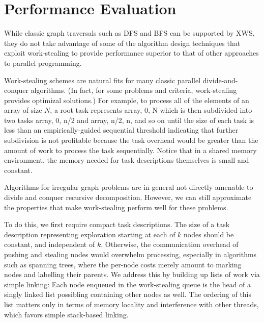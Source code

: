 \section{Performance Evaluation}\label{sec:Performance}

While classic graph traversals such as DFS and BFS can be supported by
XWS, they do not take advantage of some of the algorithm design
techniques that exploit work-stealing to provide performance superior
to that of other approaches to parallel programming.

Work-stealing schemes are natural fits for many classic parallel
divide-and-conquer algorithms. (In fact, for some problems and
criteria, work-stealing provides optimizal solutions.) For example, to
process all of the elements of an array of size $N$, a root task
represents {array, 0, N} which is then subdivided into two tasks
{array, 0, n/2} and {array, n/2, n}, and so on until the size of each
task is less than an empirically-guided sequential threshold
indicating that further subdivision is not profitable because the task
overhead would be greater than the amount of work to process the task
sequentially. Notice that in a shared memory environment, the memory
needed for task descriptions themselves is small and constant.

Algorithms for irregular graph problems are in general not directly
amenable to divide and conquer recursive decomposition. However, we
can still approximate the properties that make work-stealing perform
well for these problems.

To do this, we first require compact task descriptions.  The size of a
task description representing exploration starting at each of $k$ nodes
should be constant, and independent of $k$. Otherwise, the communication
overhead of pushing and stealing nodes would overwhelm processing,
especially in algorithms such as spanning trees, where the per-node
costs merely amount to marking nodes and labelling their parents.  We
address this by building up lists of work via simple linking: Each
node enqueued in the work-stealing queue is the head of a singly
linked list possibling containing other nodes as well. The ordering of
this list matters only in terms of memory locality and interference
with other threads, which favors simple stack-based linking.


